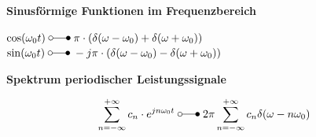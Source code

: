 	\begin{minipage}[t]{9cm}
		\textbf{Sinusf\"ormige Funktionen im Frequenzbereich}\\ 
			\hspace*{0.5cm}
			\parbox{8cm}{
				$\cos(\omega_0t) \; \laplace \; \pi \cdot (\delta(\omega - \omega_0)+ \delta(\omega + \omega_0))$\\
				$\sin(\omega_0t) \; \laplace \; -j\pi \cdot (\delta(\omega - \omega_0)- \delta(\omega + \omega_0))$	
			}
	\end{minipage}
	\begin{minipage}[t]{9cm}
		\textbf{Spektrum periodischer Leistungssignale}\\ 
			\hspace*{0.5cm}
			\parbox[b][1.2cm][c]{8cm}{
				$$\sum_{n = -\infty}^{+\infty} c_n \cdot e^{jn\omega_0t} \; \laplace \; 2\pi \sum_{n = -\infty}^{+\infty} c_n\delta(\omega - n\omega_0)$$		
			}
	\end{minipage}
